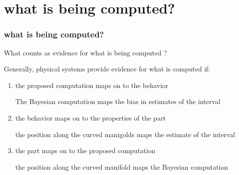 \documentclass{beamer}
\begin{document}

\section{what is being computed?}
\begin{frame}
\frametitle{\textbf{what is being computed?} }
What counts as evidence for what is being computed ?

Generally, physical systems provide evidence for what is computed if:

\begin{enumerate}
    \item the proposed computation maps on to the behavior
    
    The Bayesian computation maps the bias in estimates of the interval

    \item the behavior maps on to the properties of the part
    
    the position along the curved manigolds maps the estimate of the interval

    \item the part maps on to the proposed computation
    
    the position along the curved manifold maps the Bayesian computation
\end{enumerate}

\end{frame}

\end{document}
